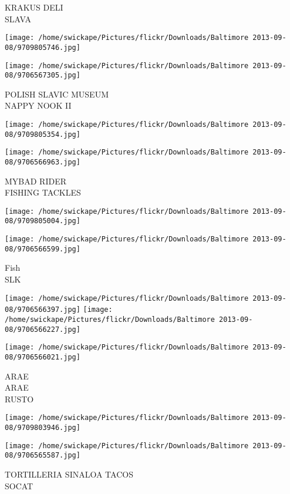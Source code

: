 \documentclass[10pt,letterpaper]{article}
\begin{document}
KRAKUS DELI\\
SLAVA
\pagebreak

\texttt{[image: /home/swickape/Pictures/flickr/Downloads/Baltimore 2013-09-08/9709805746.jpg]}

\vspace{0.25in}
\texttt{[image: /home/swickape/Pictures/flickr/Downloads/Baltimore 2013-09-08/9706567305.jpg]}

POLISH SLAVIC MUSEUM\\
NAPPY NOOK II
\pagebreak

\texttt{[image: /home/swickape/Pictures/flickr/Downloads/Baltimore 2013-09-08/9709805354.jpg]}

\vspace{0.25in}
\texttt{[image: /home/swickape/Pictures/flickr/Downloads/Baltimore 2013-09-08/9706566963.jpg]}

MYBAD RIDER\\
FISHING TACKLES
\pagebreak

\texttt{[image: /home/swickape/Pictures/flickr/Downloads/Baltimore 2013-09-08/9709805004.jpg]}

\vspace{0.25in}
\texttt{[image: /home/swickape/Pictures/flickr/Downloads/Baltimore 2013-09-08/9706566599.jpg]}

Fish\\
SLK
\pagebreak

\texttt{[image: /home/swickape/Pictures/flickr/Downloads/Baltimore 2013-09-08/9706566397.jpg]}
\texttt{[image: /home/swickape/Pictures/flickr/Downloads/Baltimore 2013-09-08/9706566227.jpg]}

\texttt{[image: /home/swickape/Pictures/flickr/Downloads/Baltimore 2013-09-08/9706566021.jpg]}

ARAE\\
ARAE\\
RUSTO
\pagebreak

\texttt{[image: /home/swickape/Pictures/flickr/Downloads/Baltimore 2013-09-08/9709803946.jpg]}

\vspace{0.25in}
\texttt{[image: /home/swickape/Pictures/flickr/Downloads/Baltimore 2013-09-08/9706565587.jpg]}

TORTILLERIA SINALOA TACOS\\
SOCAT
\pagebreak
\end{document}
